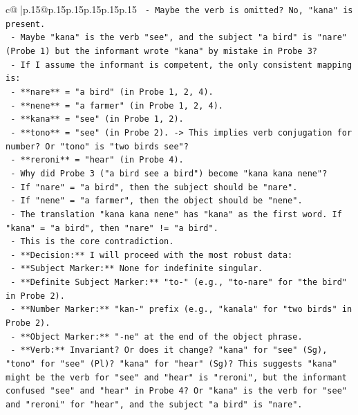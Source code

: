 \documentclass{article}
\begin{document}
{\begin{supertabular}{c@{$\;$}|p{.15\linewidth}@{}p{.15\linewidth}p{.15\linewidth}p{.15\linewidth}p{.15\linewidth}p{.15\linewidth}}
{{{\texttt{      {-} Maybe the verb is omitted? No, "kana" is present.} \\
\texttt{      {-} Maybe "kana" is the verb "see", and the subject "a bird" is "nare" (Probe 1) but the informant wrote "kana" by mistake in Probe 3?} \\
\texttt{      {-} If I assume the informant is competent, the only consistent mapping is:} \\
\texttt{        {-} **nare** = "a bird" (in Probe 1, 2, 4).} \\
\texttt{        {-} **nene** = "a farmer" (in Probe 1, 2, 4).} \\
\texttt{        {-} **kana** = "see" (in Probe 1, 2).} \\
\texttt{        {-} **tono** = "see" (in Probe 2). {-}> This implies verb conjugation for number? Or "tono" is "two birds see"?} \\
\texttt{        {-} **reroni** = "hear" (in Probe 4).} \\
\texttt{      {-} Why did Probe 3 ("a bird see a bird") become "kana kana nene"?} \\
\texttt{        {-} If "nare" = "a bird", then the subject should be "nare".} \\
\texttt{        {-} If "nene" = "a farmer", then the object should be "nene".} \\
\texttt{        {-} The translation "kana kana nene" has "kana" as the first word. If "kana" = "a bird", then "nare" != "a bird".} \\
\texttt{        {-} This is the core contradiction.} \\
\texttt{  {-} **Decision:** I will proceed with the most robust data:} \\
\texttt{    {-} **Subject Marker:** None for indefinite singular.} \\
\texttt{    {-} **Definite Subject Marker:** "to{-}" (e.g., "to{-}nare" for "the bird" in Probe 2).} \\
\texttt{    {-} **Number Marker:** "kan{-}" prefix (e.g., "kanala" for "two birds" in Probe 2).} \\
\texttt{    {-} **Object Marker:** "{-}ne" at the end of the object phrase.} \\
\texttt{    {-} **Verb:** Invariant? Or does it change? "kana" for "see" (Sg), "tono" for "see" (Pl)? "kana" for "hear" (Sg)? This suggests "kana" might be the verb for "see" and "hear" is "reroni", but the informant confused "see" and "hear" in Probe 4? Or "kana" is the verb for "see" and "reroni" for "hear", and the subject "a bird" is "nare".} \\
}}}
\end{supertabular}}
\end{document}
